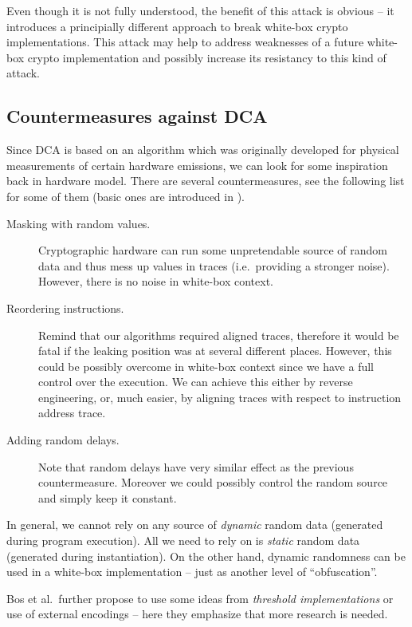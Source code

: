 Even though it is not fully understood, the benefit of this attack is obvious -- it introduces a principially different approach to break white-box crypto implementations. This attack may help to address weaknesses of a future white-box crypto implementation and possibly increase its resistancy to this kind of attack.

\subsection{Countermeasures against DCA}

Since DCA is based on an algorithm which was originally developed for physical measurements of certain hardware emissions, we can look for some inspiration back in hardware model. There are several countermeasures, see the following list for some of them (basic ones are introduced in \cite{chari1999towards,goubin1999des}).
\begin{description}
	\item[Masking with random values.] Cryptographic hardware can run some unpretendable source of random data and thus mess up values in traces (i.e.\ providing a stronger noise). However, there is no noise in white-box context.
	\item[Reordering instructions.] Remind that our algorithms required aligned traces, therefore it would be fatal if the leaking position was at several different places. However, this could be possibly overcome in white-box context since we have a full control over the execution. We can achieve this either by reverse engineering, or, much easier, by aligning traces with respect to instruction address trace.
	\item[Adding random delays.] Note that random delays have very similar effect as the previous countermeasure. Moreover we could possibly control the random source and simply keep it constant.
\end{description}
In general, we cannot rely on any source of {\em dynamic} random data (generated during program execution). All we need to rely on is {\em static} random data (generated during instantiation). On the other hand, dynamic randomness can be used in a white-box implementation -- just as another level of ``obfuscation''.

Bos et al.\ further propose to use some ideas from {\em threshold implementations} \cite{nikova2006threshold} or use of external encodings -- here they emphasize that more research is needed.
